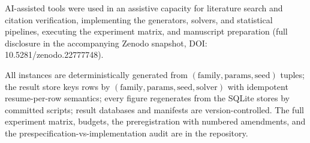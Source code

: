 \documentclass[11pt]{article}
\begin{document}
AI-assisted tools were used in an assistive capacity for literature search and
citation verification, implementing the generators, solvers, and statistical
pipelines, executing the experiment matrix, and manuscript preparation (full
disclosure in the accompanying Zenodo snapshot, DOI: 10.5281/zenodo.22777748).

All instances are deterministically generated from
$(\text{family}, \text{params}, \text{seed})$ tuples; the result store keys
rows by $(\text{family}, \text{params}, \text{seed}, \text{solver})$ with
idempotent resume-per-row semantics; every figure regenerates from the SQLite
stores by committed scripts; result databases and manifests are
version-controlled. The full experiment matrix, budgets, the preregistration
with numbered amendments, and the prespecification-vs-implementation audit are
in the repository.
\end{document}
